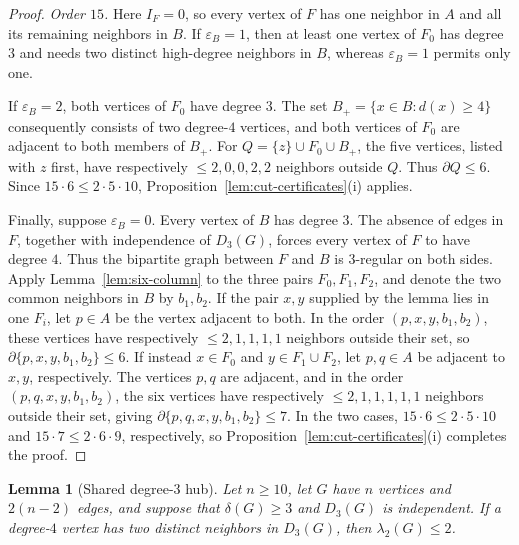 \documentclass[11pt]{article}
\numberwithin{equation}{section}
\newtheorem{lemma}[theorem]{Lemma}
\theoremstyle{definition}
\theoremstyle{remark}
\newcommand{\ac}{\lambda_2}
\begin{document}
\begin{proof}
\smallskip
\noindent\emph{Order \(15\).}
Here \(I_F=0\), so every vertex of \(F\) has one neighbor in \(A\) and
all its remaining neighbors in \(B\).  If \(\varepsilon_B=1\), then at least one
vertex of \(F_0\) has degree \(3\) and needs two distinct high-degree
neighbors in \(B\), whereas \(\varepsilon_B=1\) permits only one.

If \(\varepsilon_B=2\), both vertices of \(F_0\) have degree \(3\).  The set
\(B_+=\{x\in B:d(x)\ge4\}\) consequently consists of two degree-\(4\)
vertices, and both vertices of \(F_0\) are adjacent to both members of
\(B_+\).  For \(Q=\{z\}\cup F_0\cup B_+\), the five vertices, listed with
\(z\) first, have respectively \(\le2,0,0,2,2\) neighbors outside \(Q\).
Thus \(\partial Q\le6\).
Since \(15\cdot6\le2\cdot5\cdot10\),
Proposition~\ref{lem:cut-certificates}(i) applies.

Finally, suppose \(\varepsilon_B=0\).  Every vertex of \(B\) has degree \(3\).
The absence of edges in \(F\), together with independence of \(D_3(G)\),
forces every vertex of \(F\) to have degree \(4\).  Thus the bipartite
graph between \(F\) and \(B\) is \(3\)-regular on both sides.
Apply Lemma~\ref{lem:six-column} to the three pairs
\(F_0,F_1,F_2\), and denote the two common neighbors in \(B\) by
\(b_1,b_2\).  If the pair \(x,y\) supplied by the lemma lies in one \(F_i\), let
\(p\in A\) be the vertex adjacent to both.  In the order
\((p,x,y,b_1,b_2)\), these vertices have respectively
\(\le2,1,1,1,1\) neighbors outside their set, so
\(\partial\{p,x,y,b_1,b_2\}\le6\).  If instead \(x\in F_0\) and
\(y\in F_1\cup F_2\), let \(p,q\in A\) be adjacent to \(x,y\), respectively.
The vertices \(p,q\) are adjacent, and in the order
\((p,q,x,y,b_1,b_2)\), the six vertices have respectively
\(\le2,1,1,1,1,1\) neighbors outside their set, giving
\(\partial\{p,q,x,y,b_1,b_2\}\le7\).  In the two cases,
\(15\cdot6\le2\cdot5\cdot10\) and
\(15\cdot7\le2\cdot6\cdot9\), respectively, so
Proposition~\ref{lem:cut-certificates}(i) completes the proof.
\end{proof}

\begin{lemma}[Shared degree-\(3\) hub]\label{lem:sharp-shared-hub}
Let \(n\ge10\), let \(G\) have \(n\) vertices and \(2(n-2)\) edges,
and suppose that \(\delta(G)\ge3\) and \(D_3(G)\) is independent.
If a degree-\(4\) vertex has two distinct neighbors in \(D_3(G)\), then
\(\ac(G)\le2\).
\end{lemma}
\end{document}
